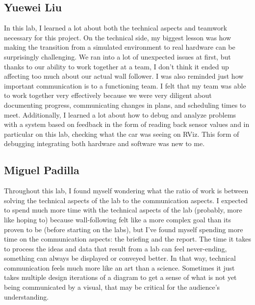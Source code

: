 \documentclass{article}
\begin{document}
\subsection*{Yuewei Liu}
In this lab, I learned a lot about both the technical aspects and teamwork necessary for this project. On the technical side, my biggest lesson was how making the transition from a simulated environment to real hardware can be surprisingly challenging. We ran into a lot of unexpected issues at first, but thanks to our ability to work together at a team, I don’t think it ended up affecting too much about our actual wall follower. I was also reminded just how important communication is to a functioning team. I felt that my team was able to work together very effectively because we were very diligent about documenting progress, communicating changes in plans, and scheduling times to meet. Additionally, I learned a lot about how to debug and analyze problems with a system based on feedback in the form of reading back sensor values and in particular on this lab, checking what the car was seeing on RViz. This form of debugging integrating both hardware and software was new to me.

\subsection*{Miguel Padilla}
Throughout this lab, I found myself wondering what the ratio of work is between solving the technical aspects of the lab to the communication aspects. I expected to spend much more time with the technical aspects of the lab (probably, more like hoping to) because wall-following felt like a more complex goal than its proven to be (before starting on the labs), but I've found myself spending more time on the communication aspects: the briefing and the report. The time it takes to process the ideas and data that result from a lab can feel never-ending, something can always be displayed or conveyed better. In that way, technical communication feels much more like an art than a science. Sometimes it just takes multiple design iterations of a diagram to get a sense of what is not yet being communicated by a visual, that may be critical for the audience's understanding.
\end{document}
